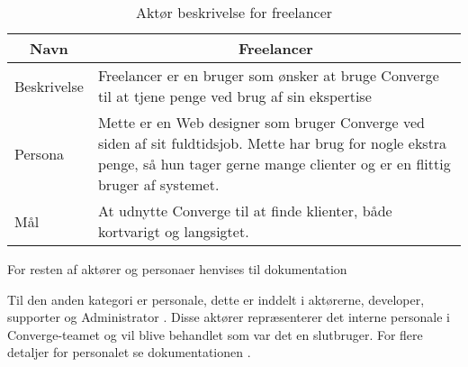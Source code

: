 \begin{table}[H]
    \begin{small}
        \caption{Aktør beskrivelse for freelancer}
        \label{tab:freelancer}
        \begin{center}
            \begin{tabular}[c]{p{3cm}|p{8cm}}
                \multicolumn{1}{c|}{\textbf{Navn}} & \multicolumn{1}{c}{\textbf{Freelancer}}                                                                                                                                                                            \\
                \hline
                Beskrivelse                        & \multicolumn{1}{p{10cm}}{Freelancer er en bruger som ønsker at bruge Converge til at tjene penge ved brug af sin ekspertise}                                                                                       \\
                \hline
                Persona                            & \multicolumn{1}{p{10cm}}{Mette er en Web designer som bruger Converge ved siden af sit fuldtidsjob. Mette har brug for nogle ekstra penge, så hun tager gerne mange clienter og er en flittig bruger af systemet.} \\
                \hline
                Mål                                & \multicolumn{1}{p{10cm}}{At udnytte Converge til at finde klienter, både kortvarigt og langsigtet.}                                                                                                                \\
            \end{tabular}
        \end{center}
    \end{small}
\end{table}

For resten af aktører og personaer henvises til dokumentation ~\cite{documentation-kravspec}

Til den anden kategori er personale, dette er inddelt i aktørerne, developer, supporter og Administrator \cite[Personale]{converge-terms}. Disse aktører repræsenterer det interne personale i Converge-teamet og vil blive behandlet som var det en slutbruger. For flere detaljer for personalet se dokumentationen \cite[Funktionelle krav]{documentation-kravspec}. 
